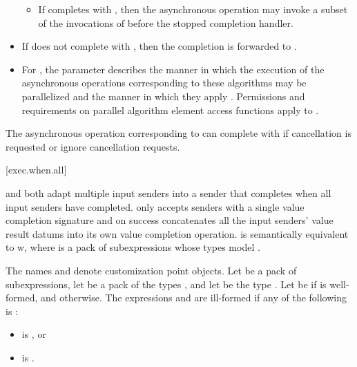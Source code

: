 \begin{itemize}
\begin{itemize}
  \item
  If  completes with , then
  the asynchronous operation may invoke a subset of
  the invocations of 
  before the stopped completion handler.
  \end{itemize}

\item
If  does not complete with , then
the completion is forwarded to .

\item
For ,
the parameter  describes
the manner in which
the execution of the asynchronous operations corresponding to these algorithms
may be parallelized and
the manner in which
they apply .
Permissions and requirements
on parallel algorithm element access functions
apply to .
\end{itemize}

\pnum
\begin{note}
The asynchronous operation corresponding to
can complete with  if cancellation is requested or
ignore cancellation requests.
\end{note}

[exec.when.all]{}

\pnum
{} and 
both adapt multiple input senders into a sender
that completes when all input senders have completed.
 only accepts senders
with a single value completion signature and
on success concatenates all the input senders' value result datums
into its own value completion operation.
 is semantically equivalent to
w,
where  is a pack of subexpressions
whose types model .

\pnum
The names  and  denote
customization point objects.
Let  be a pack of subexpressions,
let  be a pack of the types , and
let  be
the type .
Let  be  if  is well-formed, and
 otherwise.
The expressions  and
 are ill-formed
if any of the following is :
\begin{itemize}
\item
{} is , or
\item
{} is .
\end{itemize}


